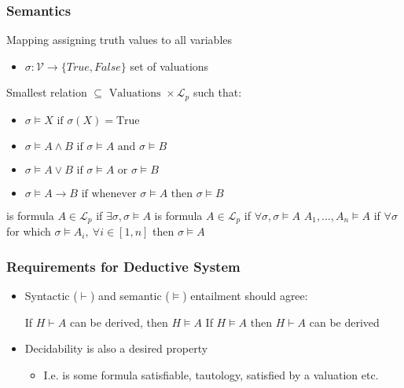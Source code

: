 \subsubsection{Semantics}
\begin{itemize}
     Mapping assigning truth values to all variables
        \begin{itemize}
            \item $\sigma: \mathcal{V} \to \{True, False\}$
             set of valuations
        \end{itemize}
     Smallest relation $\subseteq \text{ Valuations } \times \mathcal{L}_p$ such that:
        \begin{itemize}
            \item $\sigma \models X \text{ if } \sigma(X) = \text{True}$
            \item $\sigma \models A \wedge B \text{ if } \sigma \models A \text{ and } \sigma \models B$
            \item $\sigma \models A \vee B \text{ if } \sigma \models A \text{ or } \sigma \models B$
            \item $\sigma \models A \to B \text{ if whenever } \sigma \models A \text{ then } \sigma \models B$
        \end{itemize}
     is formula $A \in \mathcal{L}_p$ if $\exists \sigma, \sigma \models A$
     is formula $A \in \mathcal{L}_p$ if $\forall \sigma, \sigma \models A$
     $A_1, \dots , A_n \models A$ if $\forall \sigma$ for which $\sigma \models A_i, \ \forall i \in [1, n]$ then $\sigma \models A$
\end{itemize}

\subsubsection{Requirements for Deductive System}
\begin{itemize}
    \item Syntactic ($\vdash$) and semantic ($\models$) entailment should agree:
        \begin{itemize}
             If $H \vdash A$ can be derived, then $H \models A$
             If $H \models A$ then $H \vdash A$ can be derived
        \end{itemize}
    \item Decidability is also a desired property
        \begin{itemize}
            \item I.e. is some formula satisfiable, tautology, satisfied by a valuation etc.
        \end{itemize}
\end{itemize}

